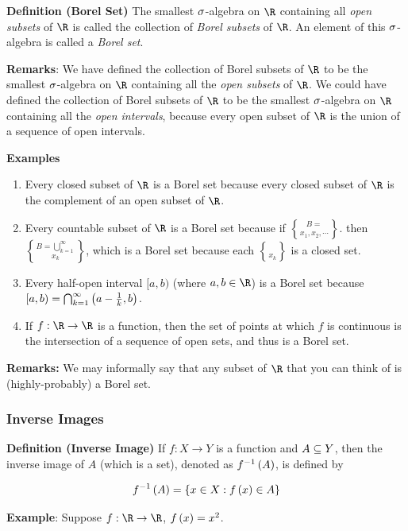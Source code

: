 \documentclass[
]{article}
\begin{document}
\textbf{Definition (Borel Set)} The smallest \(\sigma\)-algebra on \(\R\)
containing all \emph{open subsets} of \(\R\) is called the collection of
\emph{Borel subsets} of \(\R\). An element of this \(\sigma\)-algebra is
called a \emph{Borel set}.

\textbf{Remarks}: We have defined the collection of Borel subsets of
\(\R\) to be the smallest \(\sigma\)-algebra on \(\R\) containing all the
\emph{open subsets} of \(\R\). We could have defined the collection of
Borel subsets of \(\R\) to be the smallest \(\sigma\)-algebra on \(\R\)
containing all the \emph{open intervals}, because every open subset of
\(\R\) is the union of a sequence of open intervals.

\textbf{Examples}

\begin{enumerate}
\def\labelenumi{\arabic{enumi}.}
\item
  Every closed subset of \(\R\) is a Borel set because every closed
  subset of \(\R\) is the complement of an open subset of \(\R\).
\item
  Every countable subset of \(\R\) is a Borel set because if
  \(B = \brace{x_1,x_2,\cdots}\). then
  \(B = \bigcup_{k = 1}^{\infty}\brace{x_k}\), which is a Borel set
  because each \(\brace{x_k}\) is a closed set.
\item
  Every half-open interval \([a,b)\) (where \(a,b\in \R\)) is a Borel
  set because \([a,b) = \bigcap_{k = 1}^{\infty}\left(a-\frac1k,b\right)\).
\item
  If \(f:\R\to \R\) is a function, then the set of points at which \(f\)
  is continuous is the intersection of a sequence of open sets, and thus
  is a Borel set.
\end{enumerate}

\textbf{Remarks:} We may informally say that any subset of \(\R\) that
you can think of is (highly-probably) a Borel set.

\hypertarget{inverse-images}{%
\subsubsection{Inverse Images}\label{inverse-images}}

\textbf{Definition (Inverse Image)} If \(f:X\to Y\) is a function and
\(A\subseteq Y\), then the inverse image of \(A\) (which is a set), denoted as
\({f}^{-1}\left(A\right)\), is defined by

\[{f}^{-1}\left(A\right) = \left\{x\in X:f\left(x\right)\in A\right\}\]

\textbf{Example}: Suppose \(f:\R\to \R\), \(f\left(x\right) = x^2\).
\end{document}
